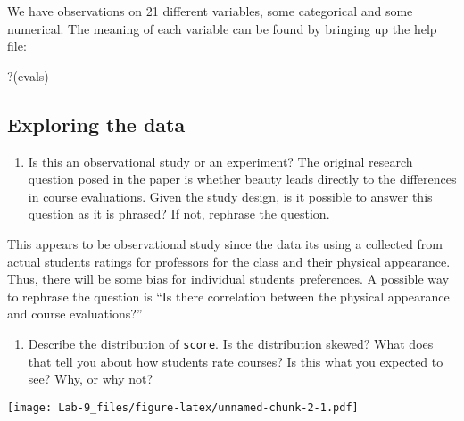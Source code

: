 \documentclass[
]{article}
\newenvironment{Shaded}{\begin{snugshade}}{\end{snugshade}}
\newcommand{\AttributeTok}[1]{\textcolor[rgb]{0.77,0.63,0.00}{#1}}
\newcommand{\FunctionTok}[1]{\textcolor[rgb]{0.00,0.00,0.00}{#1}}
\newcommand{\NormalTok}[1]{#1}
\newcommand{\SpecialCharTok}[1]{\textcolor[rgb]{0.00,0.00,0.00}{#1}}
\newcommand{\StringTok}[1]{\textcolor[rgb]{0.31,0.60,0.02}{#1}}
\providecommand{\tightlist}{%
  \setlength{\itemsep}{0pt}\setlength{\parskip}{0pt}}
\begin{document}
We have observations on 21 different variables, some categorical and
some numerical. The meaning of each variable can be found by bringing up
the help file:

\begin{Shaded}
\begin{Highlighting}[]
\StringTok{\textasciigrave{}}\AttributeTok{?}\StringTok{\textasciigrave{}}\NormalTok{(evals)}
\end{Highlighting}
\end{Shaded}

\hypertarget{exploring-the-data}{%
\subsection{Exploring the data}\label{exploring-the-data}}

\begin{enumerate}
\def\labelenumi{\arabic{enumi}.}
\tightlist
\item
  Is this an observational study or an experiment? The original research
  question posed in the paper is whether beauty leads directly to the
  differences in course evaluations. Given the study design, is it
  possible to answer this question as it is phrased? If not, rephrase
  the question.
\end{enumerate}

This appears to be observational study since the data its using a
collected from actual students ratings for professors for the class and
their physical appearance. Thus, there will be some bias for individual
students preferences. A possible way to rephrase the question is ``Is
there correlation between the physical appearance and course
evaluations?''

\begin{enumerate}
\def\labelenumi{\arabic{enumi}.}
\setcounter{enumi}{1}
\tightlist
\item
  Describe the distribution of \texttt{score}. Is the distribution
  skewed? What does that tell you about how students rate courses? Is
  this what you expected to see? Why, or why not?
\end{enumerate}

\begin{Shaded}
\end{Shaded}

\texttt{[image: Lab-9\_files/figure-latex/unnamed-chunk-2-1.pdf]}
\end{document}
